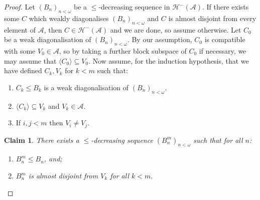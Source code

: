 \documentclass[10pt,a4paper]{amsart}
\theoremstyle{plain}
\numberwithin{equation}{section}
\newtheorem{claim}{Claim}
\theoremstyle{definition}
\renewcommand{\c}[1]{\langle #1 \rangle}
\newcommand{\cal}{\mathcal}
\newcommand{\A}{\cal{A}}
\renewcommand{\H}{\cal{H}}
\begin{document}
\begin{proof}
    Let $(B_n)_{n<\omega}$ be a $\leq$-decreasing sequence in $\H^-(\A)$. If there exists some $C$ which weakly diagonalises $(B_n)_{n<\omega}$ and $C$ is almost disjoint from every element of $\A$, then $C \in \H^-(\A)$ and we are done, so assume otherwise. Let $C_0$ be a weak diagonalisation of $(B_n)_{n<\omega}$. By our assumption, $C_0$ is compatible with some $V_0 \in \A$, so by taking a further block subspace of $C_0$ if necessary, we may assume that $\c{C_0} \subseteq V_0$. Now assume, for the induction hypothesis, that we have defined $C_k,V_k$ for $k < m$ such that:
    \begin{enumerate}
        \item $C_k \leq B_k$ is a weak diagonalisation of $(B_n)_{n<\omega}$.

        \item $\c{C_k} \subseteq V_k$ and $V_k \in \A$.

        \item If $i,j < m$ then $V_i \neq V_j$.
    \end{enumerate}

    \begin{claim}
        There exists a $\leq$-decreasing sequence $(B_n^m)_{n<\omega}$ such that for all $n$:
        \begin{enumerate}
            \item $B_n^m \leq B_n$, and;

            \item $B_n^m$ is almost disjoint from $V_k$ for all $k < m$.
        \end{enumerate}
    \end{claim}


\end{proof}
\end{document}
